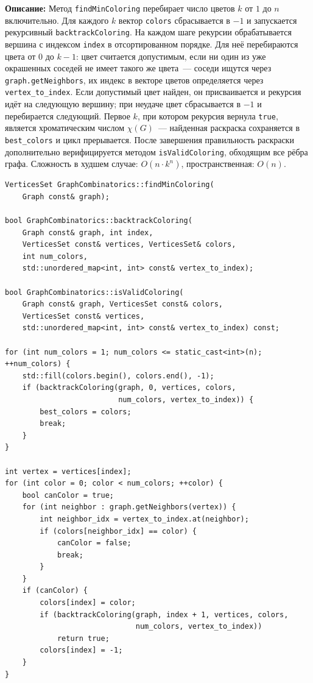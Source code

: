 \textbf{Описание:} Метод \texttt{findMinColoring} перебирает
число цветов $k$ от $1$ до $n$ включительно. Для каждого $k$
вектор \texttt{colors} сбрасывается в $-1$ и запускается
рекурсивный \texttt{backtrackColoring}. На каждом шаге рекурсии
обрабатывается вершина с индексом \texttt{index} в отсортированном
порядке. Для неё перебираются цвета от $0$ до $k-1$: цвет считается
допустимым, если ни один из уже окрашенных соседей не имеет такого
же цвета~--- соседи ищутся через \texttt{graph.getNeighbors},
их индекс в векторе цветов определяется через \texttt{vertex\_to\_index}.
Если допустимый цвет найден, он присваивается и рекурсия идёт
на следующую вершину; при неудаче цвет сбрасывается в $-1$
и перебирается следующий. Первое $k$, при котором рекурсия
вернула \texttt{true}, является хроматическим числом $\chi(G)$~---
найденная раскраска сохраняется в \texttt{best\_colors} и цикл
прерывается. После завершения правильность раскраски дополнительно
верифицируется методом \texttt{isValidColoring}, обходящим все рёбра
графа.
Сложность в худшем случае: $O(n \cdot k^n)$,
пространственная: $O(n)$.

\begin{lstlisting}[style=cppstyle, caption={Перебор числа цветов, backtracking и проверка допустимости (GraphCombinatorics.cc)}]
VerticesSet GraphCombinatorics::findMinColoring(
    Graph const& graph);

bool GraphCombinatorics::backtrackColoring(
    Graph const& graph, int index,
    VerticesSet const& vertices, VerticesSet& colors,
    int num_colors,
    std::unordered_map<int, int> const& vertex_to_index);

bool GraphCombinatorics::isValidColoring(
    Graph const& graph, VerticesSet const& colors,
    VerticesSet const& vertices,
    std::unordered_map<int, int> const& vertex_to_index) const;

for (int num_colors = 1; num_colors <= static_cast<int>(n); ++num_colors) {
    std::fill(colors.begin(), colors.end(), -1);
    if (backtrackColoring(graph, 0, vertices, colors,
                          num_colors, vertex_to_index)) {
        best_colors = colors;
        break;
    }
}

int vertex = vertices[index];
for (int color = 0; color < num_colors; ++color) {
    bool canColor = true;
    for (int neighbor : graph.getNeighbors(vertex)) {
        int neighbor_idx = vertex_to_index.at(neighbor);
        if (colors[neighbor_idx] == color) {
            canColor = false;
            break;
        }
    }
    if (canColor) {
        colors[index] = color;
        if (backtrackColoring(graph, index + 1, vertices, colors,
                              num_colors, vertex_to_index))
            return true;
        colors[index] = -1;
    }
}
\end{lstlisting}
